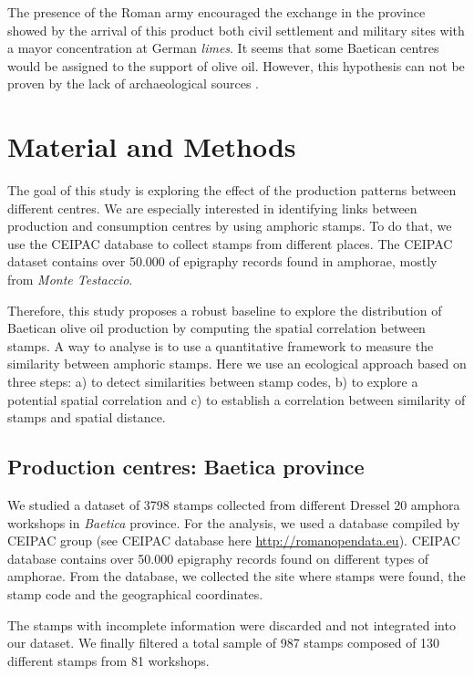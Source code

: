 \documentclass[review]{elsarticle}
\begin{document}
The presence of the Roman army encouraged the exchange in the province showed by the arrival of this product both civil settlement and military sites with a mayor concentration at German \textit{limes}. It seems that some Baetican centres would be assigned to the support of olive oil. However, this hypothesis can not be proven by the lack of archaeological sources \citep[125]{remesal_concierto}. 



\section{Material and Methods}


The goal of this study is exploring the effect of the production patterns between different centres. We are especially interested in identifying links between production and consumption centres by using amphoric stamps. To do that, we use the CEIPAC database to collect stamps from different places. The CEIPAC dataset contains over 50.000 of epigraphy records found in amphorae, mostly from \textit{Monte Testaccio}. 

Therefore, this study proposes a robust baseline to explore the distribution of Baetican olive oil production by computing the spatial correlation between stamps. A way to analyse is to use a quantitative framework to measure the similarity between amphoric stamps. Here we use an ecological approach based on three steps: a) to detect similarities between stamp codes, b) to explore a potential spatial correlation and c) to establish a correlation between similarity of stamps and spatial distance. 


\subsection{Production centres: Baetica province}

We studied a dataset of 3798 stamps collected from different Dressel 20 amphora workshops in \textit{Baetica} province. For the analysis, we used a database compiled by CEIPAC group 
\citep{remesal_centro_2015} (see CEIPAC database here \url{http://romanopendata.eu}). CEIPAC database contains over 50.000 epigraphy records found on different types of amphorae. From the database, we collected the site where stamps were found, the stamp code and the geographical coordinates. 

The stamps with incomplete information were discarded and not integrated into our dataset. We finally filtered a total sample of 987 stamps composed of 130 different stamps from 81 workshops. 
\end{document}
